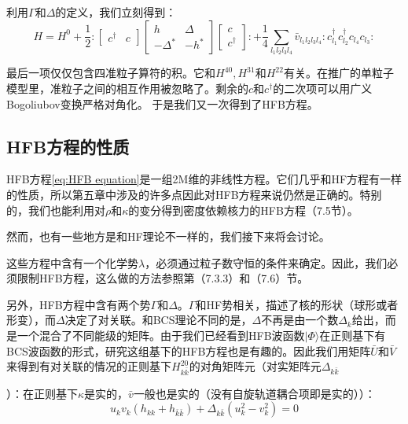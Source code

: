 利用$\Gamma$和$\Delta$的定义，我们立刻得到：
\[
H=H^{0}+\frac{1}{2}:\mathrel{\begin{bmatrix}c^{\dagger} & c\end{bmatrix}\begin{bmatrix}h & \Delta\\
-\Delta^{*} & -h^{*}
\end{bmatrix}\begin{bmatrix}c\\
c^{\dagger}
\end{bmatrix}}:+\frac{1}{4}\sum_{l_{1}l_{2}l_{3}l_{4}}\bar{v}_{l_{1}l_{2}l_{3}l_{4}}:\mathrel{c^{\dagger}_{l_{1}}c^{\dagger}_{l_{2}}c_{l_{4}}c_{l_{3}}}:
\]

最后一项仅仅包含四准粒子算符的积。它和$H^{40},H^{31}$和$H^{22}$有关。在推广的单粒子模型里，准粒子之间的相互作用被忽略了。剩余的$c$和$c^{\dagger}$的二次项可以用广义Bogoliubov变换严格对角化。
于是我们又一次得到了HFB方程。 

\subsection{HFB方程的性质}

HFB方程\ref{eq:HFB equation}是一组2M维的非线性方程。它们几乎和HF方程有一样的性质，所以第五章中涉及的许多点因此对HFB方程来说仍然是正确的。特别的，我们也能利用对$\rho$和$\kappa$的变分得到密度依赖核力的HFB方程（7.5节）。

然而，也有一些地方是和HF理论不一样的，我们接下来将会讨论。

这些方程中含有一个化学势$\lambda$，必须通过粒子数守恒的条件来确定。因此，我们必须限制HFB方程，这么做的方法参照第（7.3.3）和（7.6）节。

另外，HFB方程中含有两个势$\Gamma$和$\Delta$。$\Gamma$和HF势相关，描述了核的形状（球形或者形变），而$\Delta$决定了对关联。和BCS理论不同的是，$\Delta$不再是由一个数$\Delta_{k}$给出，而是一个混合了不同能级的矩阵。由于我们已经看到HFB波函数$|\Phi\rangle$在正则基下有BCS波函数的形式，研究这组基下的HFB方程也是有趣的。因此我们用矩阵$\bar{U}$和$\bar{V}$来得到有对关联的情况的正则基下$H^{20}_{k\bar{k}}$的对角矩阵元（对实矩阵元$\Delta_{k\bar{k}}$

）：在正则基下$\kappa$是实的，$\bar{v}$一般也是实的（没有自旋轨道耦合项即是实的））：
\[
u_{k}v_{k}(h_{kk}+h_{\bar{k}\bar{k}})+\Delta_{k\bar{k}}(u^{2}_{k}-v^{2}_{k})=0
\]

